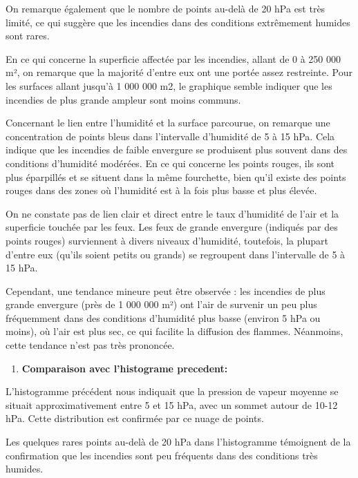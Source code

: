 \documentclass[
]{article}
\providecommand{\tightlist}{%
  \setlength{\itemsep}{0pt}\setlength{\parskip}{0pt}}
\begin{document}
On remarque également que le nombre de points au-delà de 20 hPa est très
limité, ce qui suggère que les incendies dans des conditions extrêmement
humides sont rares.

En ce qui concerne la superficie affectée par les incendies, allant de 0
à 250 000 m², on remarque que la majorité d'entre eux ont une portée
assez restreinte. Pour les surfaces allant jusqu'à 1 000 000 m2, le
graphique semble indiquer que les incendies de plus grande ampleur sont
moins communs.

Concernant le lien entre l'humidité et la surface parcourue, on remarque
une concentration de points bleus dans l'intervalle d'humidité de 5 à 15
hPa. Cela indique que les incendies de faible envergure se produisent
plus souvent dans des conditions d'humidité modérées. En ce qui concerne
les points rouges, ils sont plus éparpillés et se situent dans la même
fourchette, bien qu'il existe des points rouges dans des zones où
l'humidité est à la fois plus basse et plus élevée.

On ne constate pas de lien clair et direct entre le taux d'humidité de
l'air et la superficie touchée par les feux. Les feux de grande
envergure (indiqués par des points rouges) surviennent à divers niveaux
d'humidité, toutefois, la plupart d'entre eux (qu'ils soient petits ou
grands) se regroupent dans l'intervalle de 5 à 15 hPa.

Cependant, une tendance mineure peut être observée : les incendies de
plus grande envergure (près de 1 000 000 m²) ont l'air de survenir un
peu plus fréquemment dans des conditions d'humidité plus basse (environ
5 hPa ou moins), où l'air est plus sec, ce qui facilite la diffusion des
flammes. Néanmoins, cette tendance n'est pas très prononcée.

\begin{enumerate}
\def\labelenumi{\arabic{enumi}.}
\setcounter{enumi}{2}
\tightlist
\item
  \textbf{Comparaison avec l'histograme precedent:}
\end{enumerate}

L'histogramme précédent nous indiquait que la pression de vapeur moyenne
se situait approximativement entre 5 et 15 hPa, avec un sommet autour de
10-12 hPa. Cette distribution est confirmée par ce nuage de points.

Les quelques rares points au-delà de 20 hPa dans l'histogramme
témoignent de la confirmation que les incendies sont peu fréquents dans
des conditions très humides.
\end{document}
